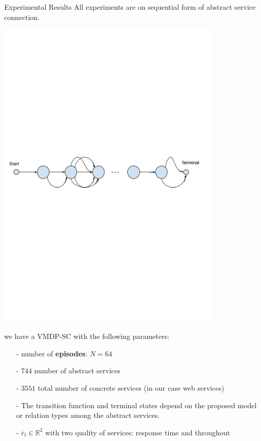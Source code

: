 \documentclass{beamer}
\begin{document}
\begin{frame}{Experimental Results}
All experiments are on sequential form of abstract service connection. 
	\begin{center}
	\includegraphics[width=0.8\textwidth]{iimas/seq-mdp-.pdf}
	\end{center}
	we have a VMDP-SC with the following parameters:
\begin{itemize}
\item[-] number of \textbf{episodes}:  $N=64$
\item[-] $744$ number of abstract services 
\item[-] $3551$ total number of concrete services (in our case web services)
\item[-] The transition function and terminal states depend on the proposed model or relation types among the abstract services. 
\item[-] $\overline{r}_t \in \mathbb{R}^2$ with two quality of services: response time and throughout 
\end{itemize}
\end{frame}
\end{document}
